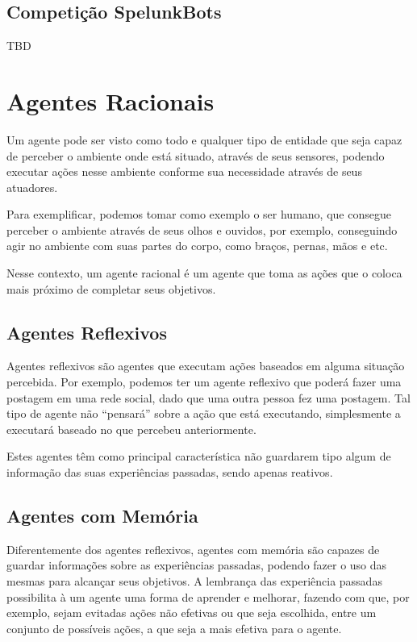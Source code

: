 \subsection{Competição SpelunkBots}

TBD

\section{Agentes Racionais}

Um agente pode ser visto como todo e qualquer tipo de entidade que seja capaz de
perceber o ambiente onde está situado, através de seus sensores, podendo
executar ações nesse ambiente conforme sua necessidade através de seus
atuadores.
\cite{Russell:1995:AIM:193191}

Para exemplificar, podemos tomar como exemplo o ser humano, que consegue
perceber o ambiente através de seus olhos e ouvidos, por exemplo, conseguindo
agir no ambiente com suas partes do corpo, como braços, pernas, mãos e etc.
\cite{Russell:1995:AIM:193191}

Nesse contexto, um agente racional é um agente que toma as ações que o coloca
mais próximo de completar seus objetivos.

\subsection{Agentes Reflexivos}

Agentes reflexivos são agentes que executam ações baseados em alguma situação
percebida. Por exemplo, podemos ter um agente reflexivo que poderá fazer uma
postagem em uma rede social, dado que uma outra pessoa fez uma postagem. Tal
tipo de agente não ``pensará'' sobre a ação que está executando, simplesmente a
executará baseado no que percebeu anteriormente.

Estes agentes têm como principal característica não guardarem tipo algum de
informação das suas experiências passadas, sendo apenas reativos.

\subsection{Agentes com Memória}

Diferentemente dos agentes reflexivos, agentes com memória são capazes de
guardar informações sobre as experiências passadas, podendo fazer o uso das
mesmas para alcançar seus objetivos. A lembrança das experiência passadas
possibilita à um agente uma forma de aprender e melhorar, fazendo com que, por
exemplo, sejam evitadas ações não efetivas ou que seja escolhida, entre um
conjunto de possíveis ações, a que seja a mais efetiva para o agente.

